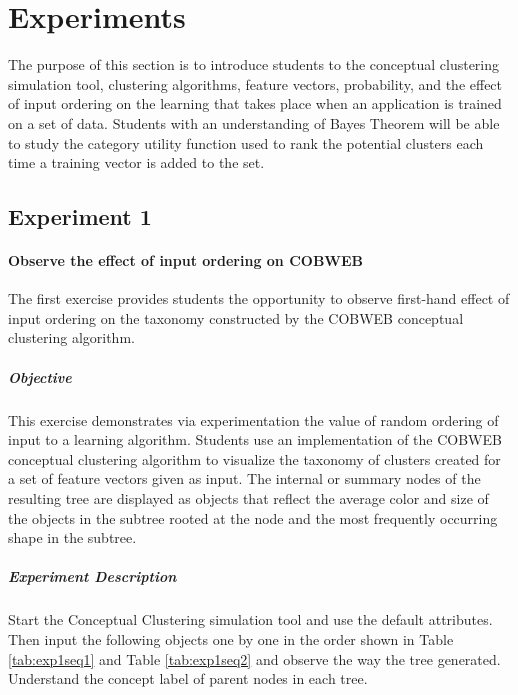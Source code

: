 %
%

\section{Experiments}
The purpose of this section is to introduce students to the conceptual clustering simulation tool, clustering algorithms, feature vectors, probability, and the effect of input ordering on the learning that takes place when an application is trained on a set of data. Students with an understanding of Bayes Theorem will be able to study the category utility function used to rank the potential clusters each time a training vector is added to the set.

\subsection{Experiment 1}
\paragraph{Observe the effect of input ordering on COBWEB}
The first exercise provides students the opportunity to observe first-hand effect of input ordering on the taxonomy constructed by the COBWEB conceptual clustering algorithm\cite{fisher1987knowledge,fisher1995optimization,gennari1989models}. 
\subparagraph{Objective} 
This exercise demonstrates via experimentation the value of random ordering of input to a learning algorithm. Students use an implementation of the COBWEB conceptual clustering algorithm to visualize the taxonomy of clusters created for a set of feature vectors given as input. The internal or summary nodes of the resulting tree are displayed as objects that reflect the average color and size of the objects in the subtree rooted at the node and the most frequently occurring shape in the subtree.
\subparagraph{Experiment Description} Start the Conceptual Clustering simulation tool and use the default attributes. Then input the following objects one by one in the order shown in Table \ref{tab:exp1seq1} and Table \ref{tab:exp1seq2} and observe the way the tree generated. Understand the concept label of parent nodes in each tree.

